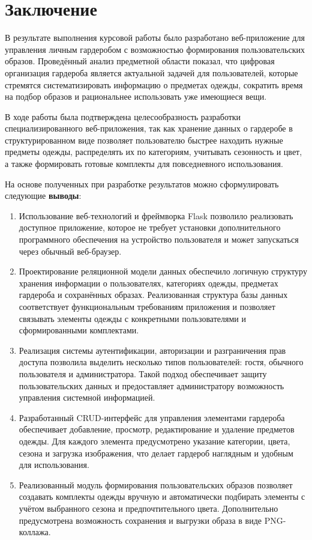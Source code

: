 \section*{Заключение}

В результате выполнения курсовой работы было разработано веб-приложение для управления личным гардеробом с возможностью формирования пользовательских образов. Проведённый анализ предметной области показал, что цифровая организация гардероба является актуальной задачей для пользователей, которые стремятся систематизировать информацию о предметах одежды, сократить время на подбор образов и рациональнее использовать уже имеющиеся вещи.

В ходе работы была подтверждена целесообразность разработки специализированного веб-приложения, так как хранение данных о гардеробе в структурированном виде позволяет пользователю быстрее находить нужные предметы одежды, распределять их по категориям, учитывать сезонность и цвет, а также формировать готовые комплекты для повседневного использования.

На основе полученных при разработке результатов можно сформулировать следующие \textbf{выводы}:

\begin{enumerate}
\item Использование веб-технологий и фреймворка Flask позволило реализовать доступное приложение, которое не требует установки дополнительного программного обеспечения на устройство пользователя и может запускаться через обычный веб-браузер.

\item Проектирование реляционной модели данных обеспечило логичную структуру хранения информации о пользователях, категориях одежды, предметах гардероба и сохранённых образах. Реализованная структура базы данных соответствует функциональным требованиям приложения и позволяет связывать элементы одежды с конкретными пользователями и сформированными комплектами.

\item Реализация системы аутентификации, авторизации и разграничения прав доступа позволила выделить несколько типов пользователей: гостя, обычного пользователя и администратора. Такой подход обеспечивает защиту пользовательских данных и предоставляет администратору возможность управления системной информацией.

\item Разработанный CRUD-интерфейс для управления элементами гардероба обеспечивает добавление, просмотр, редактирование и удаление предметов одежды. Для каждого элемента предусмотрено указание категории, цвета, сезона и загрузка изображения, что делает гардероб наглядным и удобным для использования.

\item Реализованный модуль формирования пользовательских образов позволяет создавать комплекты одежды вручную и автоматически подбирать элементы с учётом выбранного сезона и предпочтительного цвета. Дополнительно предусмотрена возможность сохранения и выгрузки образа в виде PNG-коллажа.

\end{enumerate}

